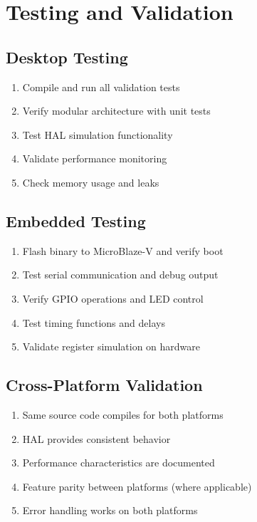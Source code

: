 \documentclass[11pt,a4paper]{article}
\begin{document}
\section{Testing and Validation}

\subsection{Desktop Testing}
\begin{enumerate}
    \item Compile and run all validation tests
    \item Verify modular architecture with unit tests
    \item Test HAL simulation functionality
    \item Validate performance monitoring
    \item Check memory usage and leaks
\end{enumerate}

\subsection{Embedded Testing}
\begin{enumerate}
    \item Flash binary to MicroBlaze-V and verify boot
    \item Test serial communication and debug output
    \item Verify GPIO operations and LED control
    \item Test timing functions and delays
    \item Validate register simulation on hardware
\end{enumerate}

\subsection{Cross-Platform Validation}
\begin{enumerate}
    \item Same source code compiles for both platforms
    \item HAL provides consistent behavior
    \item Performance characteristics are documented
    \item Feature parity between platforms (where applicable)
    \item Error handling works on both platforms
\end{enumerate}
\end{document}
